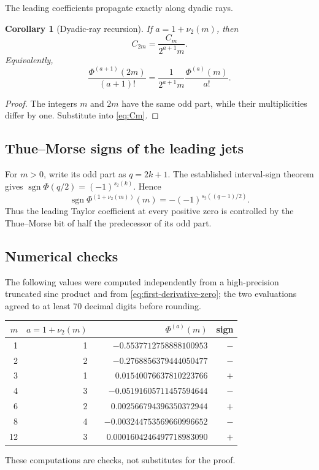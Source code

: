 \documentclass[11pt,oneside]{article}
\numberwithin{equation}{section}
\theoremstyle{plain}
\newtheorem{corollary}[theorem]{Corollary}
\theoremstyle{definition}
\theoremstyle{remark}
\newcommand{\sgn}{\operatorname{sgn}}
\begin{document}
The leading coefficients propagate exactly along dyadic rays.

\begin{corollary}[Dyadic-ray recursion]\label{cor:dyadic-ray}
If $a=1+\nu_2(m)$, then
\begin{equation}\label{eq:C-ray}
 C_{2m}=\frac{C_m}{2^{a+1}m}.
\end{equation}
Equivalently,
\begin{equation}\label{eq:der-ray}
 \frac{\Phi^{(a+1)}(2m)}{(a+1)!}
 =\frac1{2^{a+1}m}\frac{\Phi^{(a)}(m)}{a!}.
\end{equation}
\end{corollary}

\begin{proof}
The integers $m$ and $2m$ have the same odd part, while their multiplicities differ by one.  Substitute into \cref{eq:Cm}.
\end{proof}

\subsection{Thue--Morse signs of the leading jets}

For $m>0$, write its odd part as $q=2k+1$.  The established interval-sign theorem gives $\sgn\Phi(q/2)=(-1)^{s_2(k)}$.  Hence
\begin{equation}\label{eq:jet-sign}
 \boxed{\ \sgn\Phi^{(1+\nu_2(m))}(m)
 =-(-1)^{s_2((q-1)/2)}.\ }
\end{equation}
Thus the leading Taylor coefficient at every positive zero is controlled by the Thue--Morse bit of half the predecessor of its odd part.

\subsection{Numerical checks}

The following values were computed independently from a high-precision truncated sinc product and from \cref{eq:first-derivative-zero}; the two evaluations agreed to at least $70$ decimal digits before rounding.
\begin{center}
\begin{tabular}{@{}rrrr@{}}
\toprule
$m$ & $a=1+\nu_2(m)$ & $\Phi^{(a)}(m)$ & sign\\
\midrule
1  & 1 & $-0.5537712758888100953$ & $-$\\
2  & 2 & $-0.2768856379444050477$ & $-$\\
3  & 1 & $\phantom{-}0.01540076637810223766$ & $+$\\
4  & 3 & $-0.05191605711457594644$ & $-$\\
6  & 2 & $\phantom{-}0.002566794396350372944$ & $+$\\
8  & 4 & $-0.003244753569660996652$ & $-$\\
12 & 3 & $\phantom{-}0.0001604246497718983090$ & $+$\\
\bottomrule
\end{tabular}
\end{center}
These computations are checks, not substitutes for the proof.
\end{document}
